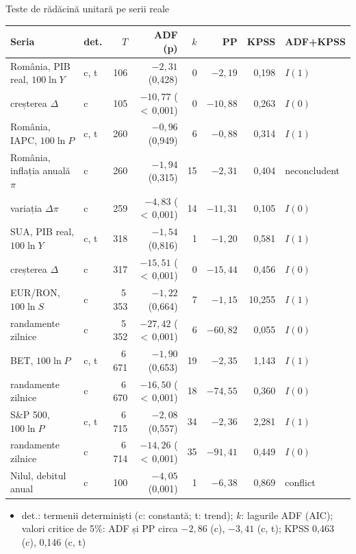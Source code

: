 \begin{frame}{Teste de rădăcină unitară pe serii reale}
\itemsize{\scriptsize}
\begin{center}
\scriptsize
\begin{tabular}{llrrrrrl}
\toprule
\textbf{Seria} & \textbf{det.} & $T$ & \textbf{ADF} (p) & $k$ & \textbf{PP} & \textbf{KPSS} & \textbf{ADF+KPSS} \\
\midrule
România, PIB real, $100\ln Y$ & c, t & 106 & $\ensuremath{-}2{,}31$ (0{,}428) & 0 & $\ensuremath{-}2{,}19$ & 0{,}198 & $I(1)$ \\
\quad creșterea $\Delta$ & c & 105 & $\ensuremath{-}10{,}77$ ($<$\,0{,}001) & 0 & $\ensuremath{-}10{,}88$ & 0{,}263 & $I(0)$ \\
România, IAPC, $100\ln P$ & c, t & 260 & $\ensuremath{-}0{,}96$ (0{,}949) & 6 & $\ensuremath{-}0{,}88$ & 0{,}314 & $I(1)$ \\
România, inflația anuală $\pi$ & c & 260 & $\ensuremath{-}1{,}94$ (0{,}315) & 15 & $\ensuremath{-}2{,}31$ & 0{,}404 & neconcludent \\
\quad variația $\Delta\pi$ & c & 259 & $\ensuremath{-}4{,}83$ ($<$\,0{,}001) & 14 & $\ensuremath{-}11{,}31$ & 0{,}105 & $I(0)$ \\
SUA, PIB real, $100\ln Y$ & c, t & 318 & $\ensuremath{-}1{,}54$ (0{,}816) & 1 & $\ensuremath{-}1{,}20$ & 0{,}581 & $I(1)$ \\
\quad creșterea $\Delta$ & c & 317 & $\ensuremath{-}15{,}51$ ($<$\,0{,}001) & 0 & $\ensuremath{-}15{,}44$ & 0{,}456 & $I(0)$ \\
EUR/RON, $100\ln S$ & c & 5\,353 & $\ensuremath{-}1{,}22$ (0{,}664) & 7 & $\ensuremath{-}1{,}15$ & 10{,}255 & $I(1)$ \\
\quad randamente zilnice & c & 5\,352 & $\ensuremath{-}27{,}42$ ($<$\,0{,}001) & 6 & $\ensuremath{-}60{,}82$ & 0{,}055 & $I(0)$ \\
BET, $100\ln P$ & c, t & 6\,671 & $\ensuremath{-}1{,}90$ (0{,}653) & 19 & $\ensuremath{-}2{,}35$ & 1{,}143 & $I(1)$ \\
\quad randamente zilnice & c & 6\,670 & $\ensuremath{-}16{,}50$ ($<$\,0{,}001) & 18 & $\ensuremath{-}74{,}55$ & 0{,}360 & $I(0)$ \\
S\&P 500, $100\ln P$ & c, t & 6\,715 & $\ensuremath{-}2{,}08$ (0{,}557) & 34 & $\ensuremath{-}2{,}36$ & 2{,}281 & $I(1)$ \\
\quad randamente zilnice & c & 6\,714 & $\ensuremath{-}14{,}26$ ($<$\,0{,}001) & 35 & $\ensuremath{-}91{,}41$ & 0{,}449 & $I(0)$ \\
Nilul, debitul anual & c & 100 & $\ensuremath{-}4{,}05$ (0{,}001) & 1 & $\ensuremath{-}6{,}38$ & 0{,}869 & conflict \\
\bottomrule
\end{tabular}
\end{center}
\begin{itemize}
    \item det.: termenii determiniști (c: constantă; t: trend); $k$: lagurile ADF (AIC); valori critice de 5\%: ADF și PP circa $-2{,}86$ (c), $-3{,}41$ (c, t); KPSS 0,463 (c), 0,146 (c, t)
\end{itemize}
\end{frame}

